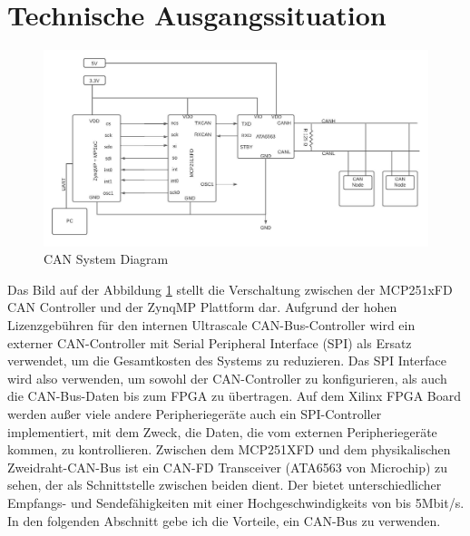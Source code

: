 \section{Technische Ausgangssituation}
\label{sec:technische_ausgangssituation}

\begin{figure}[h]
	\begin{center}
		\includegraphics[width=1.2\textwidth]{./images/can_bus_system.jpg}
	\end{center}
	\vspace{-3pt}
	\caption[CAN System Diagram]{CAN System Diagram} %
	\label{fig:can_system_diagram}
	\vspace{-5pt}
\end{figure}

Das Bild auf der Abbildung \ref{fig:can_system_diagram} stellt die Verschaltung zwischen der MCP251xFD CAN Controller und der ZynqMP Plattform dar. Aufgrund der hohen Lizenzgebühren für den internen Ultrascale CAN-Bus-Controller wird ein externer CAN-Controller mit Serial Peripheral Interface (SPI) als Ersatz verwendet, um die Gesamtkosten des Systems zu reduzieren. Das SPI Interface wird also verwenden, um sowohl der CAN-Controller zu  konfigurieren, als auch die CAN-Bus-Daten bis zum FPGA zu übertragen. Auf dem Xilinx FPGA Board werden außer viele andere Peripheriegeräte auch ein SPI-Controller implementiert, mit dem Zweck, die Daten, die vom externen Peripheriegeräte kommen, zu kontrollieren. Zwischen dem MCP251XFD und dem physikalischen Zweidraht-CAN-Bus ist ein CAN-FD Transceiver (ATA6563 von Microchip) zu sehen, der als Schnittstelle zwischen beiden dient. Der bietet unterschiedlicher Empfangs- und Sendefähigkeiten mit einer Hochgeschwindigkeits von bis 5Mbit/s. In den folgenden Abschnitt gebe ich die Vorteile, ein CAN-Bus zu verwenden.